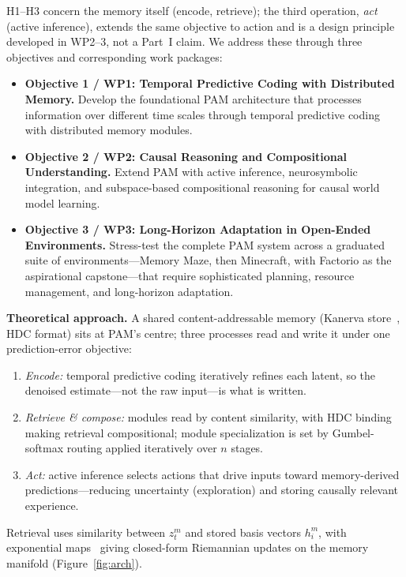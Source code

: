\noindent H1--H3 concern the memory itself (encode, retrieve); the third operation, \textit{act} (active inference), extends the same objective to action and is a design principle developed in WP2--3, not a Part~I claim. We address these through three objectives and corresponding work packages:

\begin{itemize}[noitemsep,topsep=2pt]
  \item \textbf{Objective 1 / WP1: Temporal Predictive Coding with Distributed Memory.} Develop the foundational PAM architecture that processes information over different time scales through temporal predictive coding with distributed memory modules.
  \item \textbf{Objective 2 / WP2: Causal Reasoning and Compositional Understanding.} Extend PAM with active inference, neurosymbolic integration, and subspace-based compositional reasoning for causal world model learning.
  \item \textbf{Objective 3 / WP3: Long-Horizon Adaptation in Open-Ended Environments.} Stress-test the complete PAM system across a graduated suite of environments---Memory Maze, then Minecraft, with Factorio as the aspirational capstone---that require sophisticated planning, resource management, and long-horizon adaptation.
\end{itemize}

\noindent\textbf{Theoretical approach.} A shared content-addressable memory (Kanerva store~\cite{wu2018kanerva}, HDC format) sits at PAM's centre; three processes read and write it under one prediction-error objective:
\begin{enumerate}[noitemsep,topsep=2pt]
  \item \textit{Encode:} temporal predictive coding iteratively refines each latent, so the denoised estimate---not the raw input---is what is written.
  \item \textit{Retrieve \& compose:} modules read by content similarity, with HDC binding making retrieval compositional; module specialization is set by Gumbel-softmax routing applied iteratively over $n$ stages.
  \item \textit{Act:} active inference selects actions that drive inputs toward memory-derived predictions---reducing uncertainty (exploration) and storing causally relevant experience.
\end{enumerate}

\noindent Retrieval uses similarity between $z^m_t$ and stored basis vectors $h^m_i$, with exponential maps~\cite{pettersen2025exponential} giving closed-form Riemannian updates on the memory manifold (Figure~\ref{fig:arch}).

